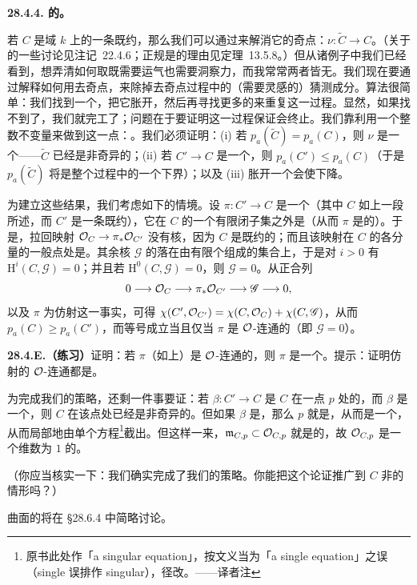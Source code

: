 \textbf{28.4.4. \trCurve{}的\trResolutionOfSingularities。}

若 $C$ 是域 $k$ 上的一条既约\trProjective\trCurve，那么我们可以通过\trNormalization{}来解消它的奇点：$\nu\colon\tilde{C}\to C$。（关于\trResolutionOfSingularities{}的一些讨论见\mbox{注记~22.4.6}；正规\trCurve{}是\trRegular{}的理由见\mbox{定理~13.5.8}。）但从诸例子中我们已经看到，想弄清如何取\trIntegralClosure{}既需要运气也需要洞察力，而我常常两者皆无。我们现在要通过解释如何用\trBlowup{}去奇点，来除掉去奇点过程中的（需要灵感的）猜测成分。算法很简单：我们找到一个\trSingularPoint，把它胀开，然后再寻找更多的\trSingularPoint{}来重复这一过程。显然，如果找不到\trSingularPoint{}了，我们就完工了；问题在于要证明这一过程保证会终止。我们靠利用一个整数不变量来做到这一点：\trArithmeticGenus。我们必须证明：(i) 若 $p_a(\tilde{C})=p_a(C)$，则 $\nu$ 是一个\trIsomorphism——$\tilde{C}$ 已经是非奇异的；(ii) 若 $C'\to C$ 是一个\trBirational\trMorphism，则 $p_a(C')\le p_a(C)$（于是 $p_a(\tilde{C})$ 将是整个过程中\trArithmeticGenus{}的一个下界）；以及 (iii) 胀开一个\trSingularPoint{}会使\trArithmeticGenus{}下降。

为建立这些结果，我们考虑如下的情境。设 $\pi\colon C'\to C$ 是一个\trFinite\trMorphism（其中 $C$ 如上一段所述，而 $C'$ 是一条既约\trCurve），它在 $C$ 的一个有限闭子集之外是\trIsomorphism（从而 $\pi$ 是\trBirational{}的）。于是，拉回映射 $\mathcal{O}_C\to\pi_*\mathcal{O}_{C'}$ 没有核，因为 $C$ 是既约的；而且该映射在 $C$ 的各分量的一般点处是\trIsomorphism。其余核 $\mathscr{G}$ 的\trSupport{}落在由有限个\trClosedPoint{}组成的集合上，于是对 $i>0$ 有 $\mathrm{H}^i(C,\mathscr{G})=0$；并且若 $\mathrm{H}^0(C,\mathscr{G})=0$，则 $\mathscr{G}=0$。从正合列
\[
0\longrightarrow\mathcal{O}_C\longrightarrow\pi_*\mathcal{O}_{C'}\longrightarrow\mathscr{G}\longrightarrow 0,
\]
以及 $\pi$ 为仿射这一事实，可得 $\chi(C',\mathcal{O}_{C'})=\chi(C,\mathcal{O}_C)+\chi(C,\mathscr{G})$，从而 $p_a(C)\ge p_a(C')$，而等号成立当且仅当 $\pi$ 是 $\mathcal{O}$-连通的（即 $\mathscr{G}=0$）。

\textbf{28.4.E.（练习）}\quad 证明：若 $\pi$（如上）是 $\mathcal{O}$-连通的，则 $\pi$ 是一个\trIsomorphism。提示：证明仿射的 $\mathcal{O}$-连通\trMorphism{}都是\trIsomorphism。

为完成我们的策略，还剩一件事要证：若 $\beta\colon C'\to C$ 是 $C$ 在一点 $p$ 处的\trBlowup，而 $\beta$ 是一个\trIsomorphism，则 $C$ 在该点处已经是非奇异的。但如果 $\beta$ 是\trIsomorphism，那么 $p$ 就是\trExceptionalDivisor，从而是一个\trEffectiveCartierDivisor，从而局部地由单个方程\footnote{原书此处作「a singular equation」，按文义当为「a single equation」之误（single 误排作 singular），径改。——译者注}截出。但这样一来，$\mathfrak{m}_{C,p}\subset\mathcal{O}_{C,p}$ 就是\trPrincipal{}的，故 $\mathcal{O}_{C,p}$ 是一个维数为 $1$ 的\trRegular\trLocalRing。

（你应当核实一下：我们确实完成了我们的策略。你能把这个论证推广到 $C$ 非\trProjective{}的情形吗？）

曲面的\trResolutionOfSingularities{}将在 \S28.6.4 中简略讨论。
